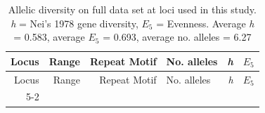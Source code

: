 \documentclass[fleqn,10pt,lineno]{wlpeerj} %
\theoremstyle{definition}
\theoremstyle{definition}
\theoremstyle{definition}
\theoremstyle{remark}
\begin{document}
\begin{longtable}[]{@{}rrrlrl@{}}
\caption{\label{tab:locus-stats} Allelic diversity on full data set at loci
used in this study. \emph{h} = Nei's 1978 gene diversity, \(E_5\) =
Evenness. Average \emph{h} = 0.583, average \(E_5\) = 0.693, average no.
alleles = 6.27}\tabularnewline
\toprule
\begin{minipage}[b]{0.08\columnwidth}\raggedleft\strut
Locus\strut
\end{minipage} & \begin{minipage}[b]{0.10\columnwidth}\raggedleft\strut
Range\strut
\end{minipage} & \begin{minipage}[b]{0.29\columnwidth}\raggedleft\strut
Repeat Motif\strut
\end{minipage} & \begin{minipage}[b]{0.14\columnwidth}\raggedright\strut
No. alleles\strut
\end{minipage} & \begin{minipage}[b]{0.06\columnwidth}\raggedleft\strut
\emph{h}\strut
\end{minipage} & \begin{minipage}[b]{0.07\columnwidth}\raggedright\strut
\(E_5\)\strut
\end{minipage}\tabularnewline
\midrule
\endfirsthead
\toprule
\begin{minipage}[b]{0.08\columnwidth}\raggedleft\strut
Locus\strut
\end{minipage} & \begin{minipage}[b]{0.10\columnwidth}\raggedleft\strut
Range\strut
\end{minipage} & \begin{minipage}[b]{0.29\columnwidth}\raggedleft\strut
Repeat Motif\strut
\end{minipage} & \begin{minipage}[b]{0.14\columnwidth}\raggedright\strut
No. alleles\strut
\end{minipage} & \begin{minipage}[b]{0.06\columnwidth}\raggedleft\strut
\emph{h}\strut
\end{minipage} & \begin{minipage}[b]{0.07\columnwidth}\raggedright\strut
\(E_5\)\strut
\end{minipage}\tabularnewline
\midrule
\endhead
\begin{minipage}[t]{0.08\columnwidth}\raggedleft\strut
5-2\strut
\end{minipage} & \begin{minipage}[t]{0.10\columnwidth}\raggedleft\strut

\end{minipage}
\end{longtable}
\end{document}
